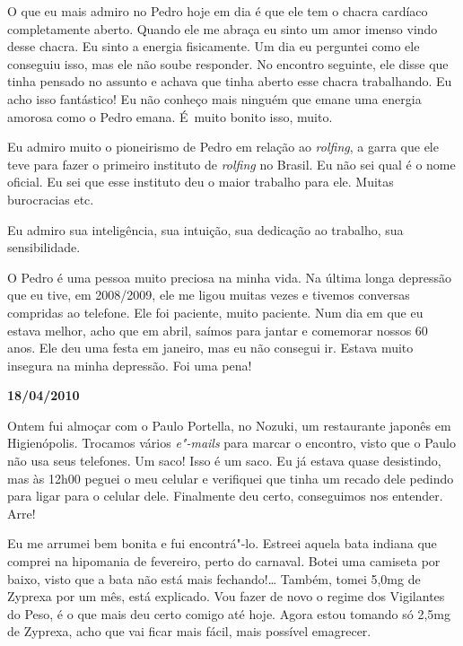 O que eu mais admiro no Pedro hoje em dia é que ele tem o chacra
cardíaco completamente aberto. Quando ele me abraça eu sinto um amor
imenso vindo desse chacra. Eu sinto a energia fisicamente. Um dia eu
perguntei como ele conseguiu isso, mas ele não soube responder. No
encontro seguinte, ele disse que tinha pensado no assunto e achava que
tinha aberto esse chacra trabalhando. Eu acho isso fantástico! Eu não
conheço mais ninguém que emane uma energia amorosa como o Pedro emana. É~muito bonito isso, muito.

Eu admiro muito o pioneirismo de Pedro em relação ao \emph{rolfing}, a
garra que ele teve para fazer o primeiro instituto de \emph{rolfing} no
Brasil. Eu não sei qual é o nome oficial. Eu sei que esse instituto deu
o maior trabalho para ele. Muitas burocracias etc.

Eu admiro sua inteligência, sua intuição, sua dedicação ao trabalho, sua
sensibilidade.

O Pedro é uma pessoa muito preciosa na minha vida. Na última longa
depressão que eu tive, em 2008/2009, ele me ligou muitas vezes e tivemos
conversas compridas ao telefone. Ele foi paciente, muito paciente. Num
dia em que eu estava melhor, acho que em abril, saímos para jantar e
comemorar nossos 60 anos. Ele deu uma festa em janeiro, mas eu não
consegui ir. Estava muito insegura na minha depressão. Foi uma pena!

\begin{center}\textbf{\asterisc{}}\end{center}

\begin{flushright}\textbf{18/04/2010}\end{flushright}


Ontem fui almoçar com o Paulo Portella, no Nozuki, um restaurante
japonês em Higienópolis. Trocamos vários \emph{e"-mails} para marcar o
encontro, visto que o Paulo não usa seus telefones. Um saco! Isso é um
saco. Eu já estava quase desistindo, mas às 12h00 peguei o meu celular e
verifiquei que tinha um recado dele pedindo para ligar para o celular
dele. Finalmente deu certo, conseguimos nos entender. Arre!

Eu me arrumei bem bonita e fui encontrá"-lo. Estreei aquela bata indiana
que comprei na hipomania de fevereiro, perto do carnaval. Botei uma
camiseta por baixo, visto que a bata não está mais fechando!…
Também, tomei 5,0mg de Zyprexa por um mês, está explicado. Vou fazer de
novo o regime dos Vigilantes do Peso, é o que mais deu certo comigo até
hoje. Agora estou tomando só 2,5mg de Zyprexa, acho que vai ficar mais
fácil, mais possível emagrecer.

